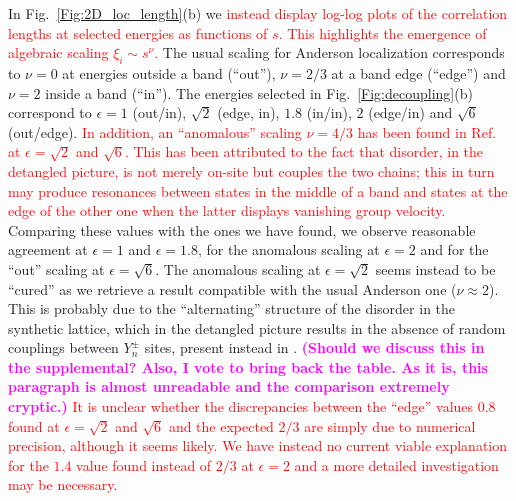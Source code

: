 \documentclass[prl,aps,twocolumn,showpacs,superscriptaddress,longbibliography]{revtex4-1}
\newcommand{\changer}[1]{\textcolor{red}{#1}}
\newcommand{\tochange}[1]{\textcolor{magenta}{#1}}
\newcommand{\mm}[1]{{\tochange{\footnotesize{\bf (#1)}}}}
\begin{document}
In Fig.~\ref{Fig:2D_loc_length}(b) we \changer{instead display log-log plots of the correlation lengths at selected energies as functions of $s$. This highlights the emergence of algebraic scaling $\xi_i \sim s^\nu$.} The usual scaling for Anderson localization corresponds to $\nu = 0$ at energies outside a band (``out''), $\nu = 2/3$ at a band edge (``edge'') and $\nu = 2$ inside a band (``in''). The energies selected in Fig.~\ref{Fig:decoupling}(b) correspond to $\epsilon =1$ (out/in), $\sqrt{2}$ (edge, in), $1.8$ (in/in), $2$ (edge/in) and $\sqrt{6}$ (out/edge). \changer{In addition, an ``anomalous'' scaling $\nu = 4/3$ has been found in Ref.~\cite{Leykam2017} at $\epsilon = \sqrt{2}$ and $\sqrt{6}$. This has been attributed to the fact that disorder, in the detangled picture, is not merely on-site but couples the two chains; this in turn may produce resonances between states in the middle of a band and states at the edge of the other one when the latter displays vanishing group velocity.} Comparing these values with the ones we have found, we observe reasonable agreement at $\epsilon = 1$ and $\epsilon = 1.8$, for the anomalous scaling at $\epsilon = 2$ and for the ``out'' scaling at $\epsilon = \sqrt{6}$. The anomalous scaling at $\epsilon = \sqrt{2}$ seems instead to be ``cured'' as we retrieve a result compatible with the usual Anderson one ($\nu  \approx 2$). This is probably due to the ``alternating'' structure of the disorder in the synthetic lattice, which in the detangled picture results in the absence of random couplings between $Y_n^{\pm}$ sites, present instead in \cite{Leykam2017}. \mm{Should we discuss this in the supplemental? Also, I vote to bring back the table. As it is, this paragraph is almost unreadable and the comparison extremely cryptic.}  \changer{It is unclear whether the discrepancies between the ``edge'' values $0.8$ found at $\epsilon = \sqrt{2}$ and $\sqrt{6}$ and the expected $2/3$ are simply due to numerical precision, although it seems likely. We have instead no current viable explanation for the $1.4$ value found instead of $2/3$ at $\epsilon =2$ and a more detailed investigation may be necessary. }  

\end{document}
